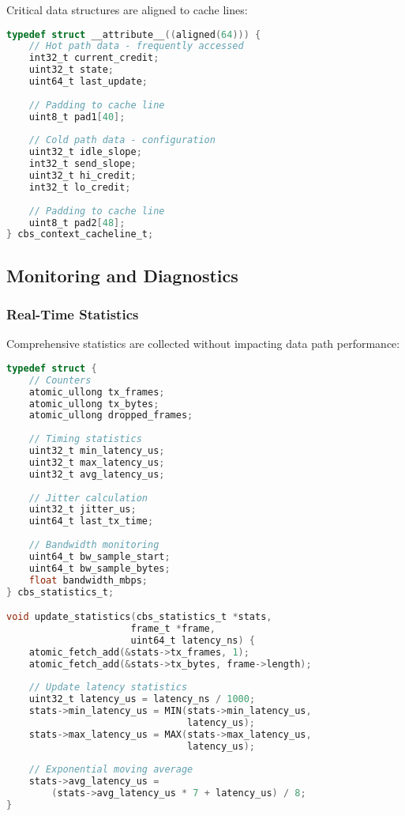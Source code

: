 \documentclass[10pt, journal, compsoc]{IEEEtran}
\begin{document}
Critical data structures are aligned to cache lines:

\begin{lstlisting}[language=C, caption=Cache-Aligned Structures]
typedef struct __attribute__((aligned(64))) {
    // Hot path data - frequently accessed
    int32_t current_credit;
    uint32_t state;
    uint64_t last_update;
    
    // Padding to cache line
    uint8_t pad1[40];
    
    // Cold path data - configuration
    uint32_t idle_slope;
    int32_t send_slope;
    uint32_t hi_credit;
    int32_t lo_credit;
    
    // Padding to cache line
    uint8_t pad2[48];
} cbs_context_cacheline_t;
\end{lstlisting}

\subsection{Monitoring and Diagnostics}

\subsubsection{Real-Time Statistics}

Comprehensive statistics are collected without impacting data path performance:

\begin{lstlisting}[language=C, caption=Statistics Collection]
typedef struct {
    // Counters
    atomic_ullong tx_frames;
    atomic_ullong tx_bytes;
    atomic_ullong dropped_frames;
    
    // Timing statistics
    uint32_t min_latency_us;
    uint32_t max_latency_us;
    uint32_t avg_latency_us;
    
    // Jitter calculation
    uint32_t jitter_us;
    uint64_t last_tx_time;
    
    // Bandwidth monitoring
    uint64_t bw_sample_start;
    uint64_t bw_sample_bytes;
    float bandwidth_mbps;
} cbs_statistics_t;

void update_statistics(cbs_statistics_t *stats,
                      frame_t *frame,
                      uint64_t latency_ns) {
    atomic_fetch_add(&stats->tx_frames, 1);
    atomic_fetch_add(&stats->tx_bytes, frame->length);
    
    // Update latency statistics
    uint32_t latency_us = latency_ns / 1000;
    stats->min_latency_us = MIN(stats->min_latency_us,
                                latency_us);
    stats->max_latency_us = MAX(stats->max_latency_us,
                                latency_us);
    
    // Exponential moving average
    stats->avg_latency_us = 
        (stats->avg_latency_us * 7 + latency_us) / 8;
}
\end{lstlisting}
\end{document}
